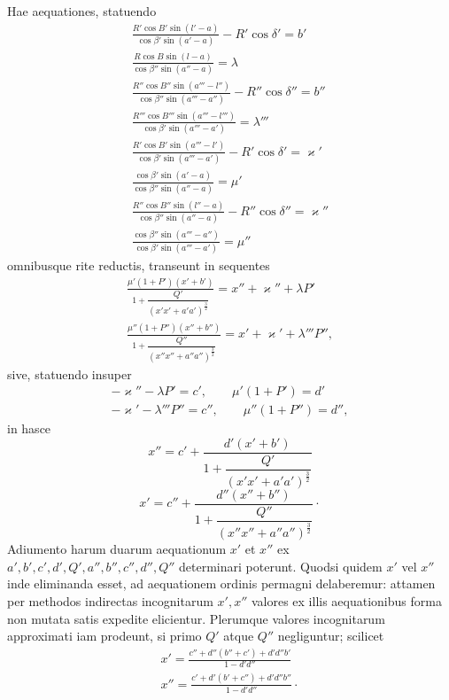 Hae aequationes, statuendo
\[
\begin{gathered}
\frac{R'\cos B'\sin(l'-a)}{\cos\beta'\sin(a'-a)}-R'\cos\delta'=b'\\[.7em]
\frac{R\cos B\sin(l-a)}{\cos\beta''\sin(a''-a)}=\lambda\\[.7em]
\frac{R''\cos B''\sin(a'''-l'')}{\cos\beta''\sin(a'''-a'')}-R''\cos\delta''=b''\\[.7em]
\frac{R'''\cos B'''\sin(a'''-l''')}{\cos\beta'\sin(a'''-a')}=\lambda'''\\[.7em]
\frac{R'\cos B'\sin(a'''-l')}{\cos\beta'\sin(a'''-a')}-R'\cos\delta'=\varkappa'\\[.7em]
\frac{\cos\beta'\sin(a'-a)}{\cos\beta''\sin(a''-a)}=\mu'\\[.7em]
\frac{R''\cos B''\sin(l''-a)}{\cos\beta''\sin(a''-a)}-R''\cos\delta''=\varkappa''\\[.7em]
\frac{\cos\beta''\sin(a'''-a'')}{\cos\beta'\sin(a'''-a')}=\mu''
\end{gathered}
\]
omnibusque rite reductis, transeunt in sequentes
\[
\begin{gathered}
\frac{\mu'(1+P')(x'+b')}{1+\dfrac{Q'}{(x'x'+a'a')^{\frac32}}}=x''+\varkappa''+\lambda P'\\[1em]
\frac{\mu''(1+P'')(x''+b'')}{1+\dfrac{Q''}{(x''x''+a''a'')^{\frac32}}}=x'+\varkappa'+\lambda'''P'',
\end{gathered}
\]
sive, statuendo insuper
\[
\begin{gathered}
-\varkappa''-\lambda P'=c',\qquad\mu'(1+P')=d'\\[.5em]
-\varkappa'-\lambda'''P''=c'',\qquad\mu''(1+P'')=d'',
\end{gathered}
\]
in hasce
\[
\tag*{I.}x''=c'+\frac{d'(x'+b')}{1+\dfrac{Q'}{(x'x'+a'a')^{\frac32}}}
\]
\[
\tag*{II.}x'=c''+\frac{d''(x''+b'')}{1+\dfrac{Q''}{(x''x''+a''a'')^{\frac32}}}\mathpunct{\cdot}
\]
Adiumento harum duarum aequationum $x'$ et $x''$ ex \newline $a',b',c',d',Q',a'',b'',c'',d'',Q''$ determinari poterunt. Quodsi quidem $x'$ vel $x''$ inde eliminanda esset, ad aequationem ordinis permagni\HistoricalNoteEight{Handschriftliche Bemerkung:] ordinis $64^{\mathrm{ti}}$.} delaberemur: attamen per methodos indirectas incognitarum $x',x''$ valores ex illis aequationibus forma non mutata satis expedite elicientur. Plerumque valores incognitarum approximati iam prodeunt, si primo $Q'$ atque $Q''$ negliguntur; scilicet
\[
\begin{gathered}
x'=\frac{c''+d''(b''+c')+d'd''b'}{1-d'd''}\\[.6em]
x''=\frac{c'+d'(b'+c'')+d'd''b''}{1-d'd''}\mathpunct{\cdot}
\end{gathered}
\]

